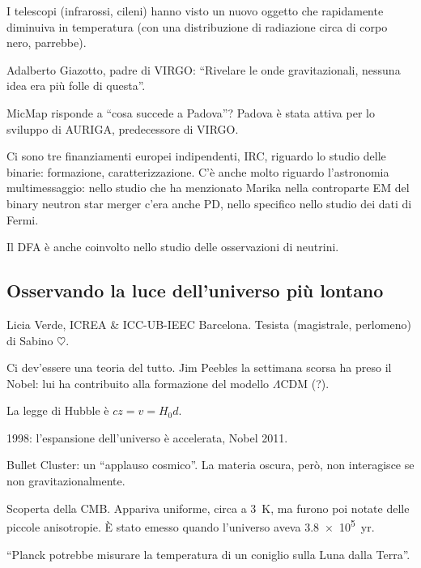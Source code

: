\documentclass[main.tex]{subfiles}
\begin{document}

I telescopi (infrarossi, cileni) hanno visto un nuovo oggetto che rapidamente diminuiva in temperatura (con una distribuzione di radiazione circa di corpo nero, parrebbe).

Adalberto Giazotto, padre di VIRGO: ``Rivelare le onde gravitazionali, nessuna idea era più folle di questa''.

MicMap risponde a ``cosa succede a Padova''?
Padova è stata attiva per lo sviluppo di AURIGA, predecessore di VIRGO.

Ci sono tre finanziamenti europei indipendenti, IRC, riguardo lo studio delle binarie: formazione, caratterizzazione.
C'è anche molto riguardo l'astronomia multimessaggio: nello studio che ha menzionato Marika nella controparte EM del binary neutron star merger c'era anche PD, nello specifico nello studio dei dati di Fermi.

Il DFA è anche coinvolto nello studio delle osservazioni di neutrini.

\subsection{Osservando la luce dell'universo più lontano}

Licia Verde, ICREA \& ICC-UB-IEEC Barcelona. 
Tesista (magistrale, perlomeno) di Sabino \(\heartsuit\).

Ci dev'essere una teoria del tutto.
Jim Peebles la settimana scorsa ha preso il Nobel: lui ha contribuito alla formazione del modello \(\Lambda \)CDM (?).

La legge di Hubble è \(cz = v = H_0 d\).

1998: l'espansione dell'universo è accelerata, Nobel 2011. 

Bullet Cluster: un ``applauso cosmico''. La materia oscura, però, non interagisce se non gravitazionalmente.

Scoperta della CMB. Appariva uniforme, circa a \SI{3}{K}, ma furono poi notate delle piccole anisotropie.
È stato emesso quando l'universo aveva \SI{3.8e5}{yr}.

``Planck potrebbe misurare la temperatura di un coniglio sulla Luna dalla Terra''.

\end{document}
